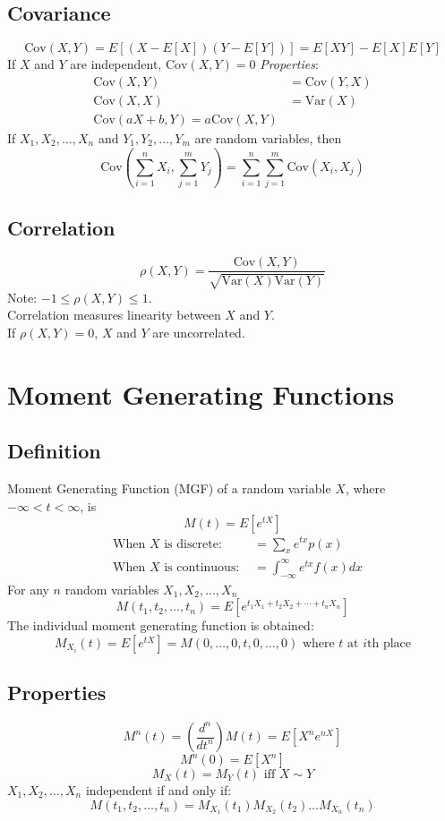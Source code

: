 \documentclass[12pt]{article}
\newcommand{\Cov}{\text{Cov}}
\newcommand{\Var}{\text{Var}}
\begin{document}
\subsection{Covariance}
\[
    \Cov(X,Y) = E[(X-E[X])(Y-E[Y])] = E[XY] - E[X]E[Y]
\]
If $X$ and $Y$ are independent, $\Cov(X,Y) = 0$
\emph{Properties}:
\begin{align*}
    \Cov(X,Y) &= \Cov(Y,X) \\
    \Cov(X,X) &= \Var(X) \\
    \Cov(aX+b, Y) = a\Cov(X,Y)
\end{align*}
If $X_1, X_2, \ldots, X_n$ and $Y_1, Y_2, \ldots, Y_m$ are random variables, then
\[
    \Cov\left( \sum_{i=1}^n X_i, \sum_{j=1}^m Y_j \right) = \sum_{i=1}^n \sum_{j=1}^m \Cov(X_i, X_j)
\]
\subsection{Correlation}
\[
    \rho(X,Y) = \frac{\Cov(X,Y)}{\sqrt{\Var(X)\Var(Y)}}
\]
Note: $-1 \leq \rho(X,Y) \leq 1$. \\
Correlation measures linearity between $X$ and $Y$.\\
If $\rho(X,Y) = 0$, $X$ and $Y$ are uncorrelated.

\section{Moment Generating Functions}
\subsection{Definition}
Moment Generating Function (MGF) of a random variable $X$, where $-\infty < t < \infty$, is
\[
    M(t) = E[e^{tX}]
\]
\begin{align*}
    &\text{When $X$ is discrete: }      &= \sum_x e^{tx} p(x) \\
    &\text{When $X$ is continuous: }    &= \int_{-\infty}^{\infty} e^{tx} f(x) dx
\end{align*}
For any $n$ random variables $X_1, X_2, \ldots, X_n$
\[
    M(t_1, t_2, \ldots, t_n) = E[e^{t_1X_1+t_2X_2+\cdots+t_nX_n}]
\]
The individual moment generating function is obtained:
\[
    M_{X_i}(t) = E[e^{tX}] = M(0, \ldots, 0, t, 0, \ldots, 0) \text{ where $t$ at $i$th place}
\]
\subsection{Properties}
\[
    M^n(t) = \left( \frac{d^n}{dt^n} \right) M(t) = E[X^n e^{nX}]
\]
\[
    M^n(0) = E[X^n]
\]
\[
    M_X(t) = M_Y(t) \text{ iff } X \sim Y
\]
$X_1, X_2, \ldots, X_n$ independent if and only if:
\[
    M(t_1, t_2, \ldots, t_n) = M_{X_1}(t_1)M_{X_2}(t_2)\ldots M_{X_n}(t_n)
\]
\end{document}
